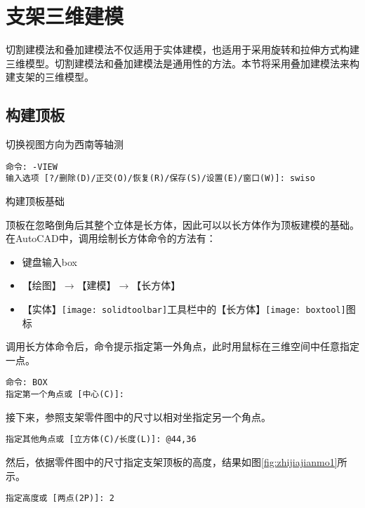 \section{支架三维建模}

切割建模法和叠加建模法不仅适用于实体建模，也适用于采用旋转和拉伸方式构建三维模型。切割建模法和叠加建模法是通用性的方法。本节将采用叠加建模法来构建支架的三维模型。

\subsection{构建顶板}
\begin{procedure}
\item 切换视图方向为西南等轴测

\begin{lstlisting}
命令: -VIEW
输入选项 [?/删除(D)/正交(O)/恢复(R)/保存(S)/设置(E)/窗口(W)]: swiso
\end{lstlisting}

\item 构建顶板基础

顶板在忽略倒角后其整个立体是长方体，因此可以以长方体作为顶板建模的基础。在AutoCAD中，调用绘制长方体命令的方法有：
\begin{itemize}
\item 键盘输入box
\item 【绘图】$\rightarrow $【建模】$\rightarrow $【长方体】
\item 【实体】\texttt{[image: solidtoolbar]}工具栏中的【长方体】\texttt{[image: boxtool]}图标
\end{itemize}

调用长方体命令后，命令提示指定第一外角点，此时用鼠标在三维空间中任意指定一点。
\begin{lstlisting}
命令: BOX
指定第一个角点或 [中心(C)]:
\end{lstlisting}

接下来，参照支架零件图中的尺寸以相对坐指定另一个角点。
\begin{lstlisting}
指定其他角点或 [立方体(C)/长度(L)]: @44,36
\end{lstlisting}
然后，依据零件图中的尺寸指定支架顶板的高度，结果如图\ref{fig:zhijiajianmo1}所示。

\begin{lstlisting}
指定高度或 [两点(2P)]: 2
\end{lstlisting}


\end{procedure}

